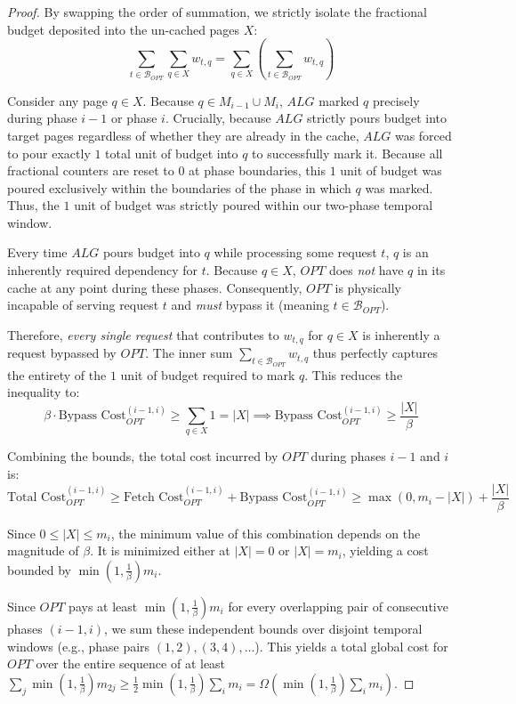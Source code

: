 \documentclass[a4paper]{article}
\begin{document}
\begin{proof}
By swapping the order of summation, we strictly isolate the fractional budget deposited into the un-cached pages $X$:
$$ \sum_{t \in \mathcal{B}_{OPT}} \sum_{q \in X} w_{t,q} = \sum_{q \in X} \left( \sum_{t \in \mathcal{B}_{OPT}} w_{t,q} \right) $$

Consider any page $q \in X$. Because $q \in M_{i-1} \cup M_i$, $ALG$ marked $q$ precisely during phase $i-1$ or phase $i$. 
Crucially, because $ALG$ strictly pours budget into target pages regardless of whether they are already in the cache, $ALG$ was forced to pour exactly $1$ total unit of budget into $q$ to successfully mark it. Because all fractional counters are reset to $0$ at phase boundaries, this $1$ unit of budget was poured exclusively within the boundaries of the phase in which $q$ was marked. Thus, the $1$ unit of budget was strictly poured within our two-phase temporal window.

Every time $ALG$ pours budget into $q$ while processing some request $t$, $q$ is an inherently required dependency for $t$. Because $q \in X$, $OPT$ does \textit{not} have $q$ in its cache at any point during these phases. Consequently, $OPT$ is physically incapable of serving request $t$ and \textit{must} bypass it (meaning $t \in \mathcal{B}_{OPT}$). 

Therefore, \textit{every single request} that contributes to $w_{t,q}$ for $q \in X$ is inherently a request bypassed by $OPT$. The inner sum $\sum_{t \in \mathcal{B}_{OPT}} w_{t,q}$ thus perfectly captures the entirety of the $1$ unit of budget required to mark $q$. This reduces the inequality to:
$$ \beta \cdot \text{Bypass Cost}_{OPT}^{(i-1, i)} \ge \sum_{q \in X} 1 = |X| \implies \text{Bypass Cost}_{OPT}^{(i-1, i)} \ge \frac{|X|}{\beta} $$

Combining the bounds, the total cost incurred by $OPT$ during phases $i-1$ and $i$ is:
$$ \text{Total Cost}_{OPT}^{(i-1, i)} \ge \text{Fetch Cost}_{OPT}^{(i-1, i)} + \text{Bypass Cost}_{OPT}^{(i-1, i)} \ge \max(0, m_i - |X|) + \frac{|X|}{\beta} $$

Since $0 \le |X| \le m_i$, the minimum value of this combination depends on the magnitude of $\beta$. It is minimized either at $|X|=0$ or $|X|=m_i$, yielding a cost bounded by $\min(1, \frac{1}{\beta}) m_i$. 

Since $OPT$ pays at least $\min(1, \frac{1}{\beta}) m_i$ for every overlapping pair of consecutive phases $(i-1, i)$, we sum these independent bounds over disjoint temporal windows (e.g., phase pairs $(1,2), (3,4), \dots$). This yields a total global cost for $OPT$ over the entire sequence of at least $\sum_j \min(1, \frac{1}{\beta}) m_{2j} \ge \frac{1}{2} \min(1, \frac{1}{\beta}) \sum_i m_i = \Omega\left(\min(1, \frac{1}{\beta}) \sum_i m_i\right)$. 
\end{proof}
\end{document}
